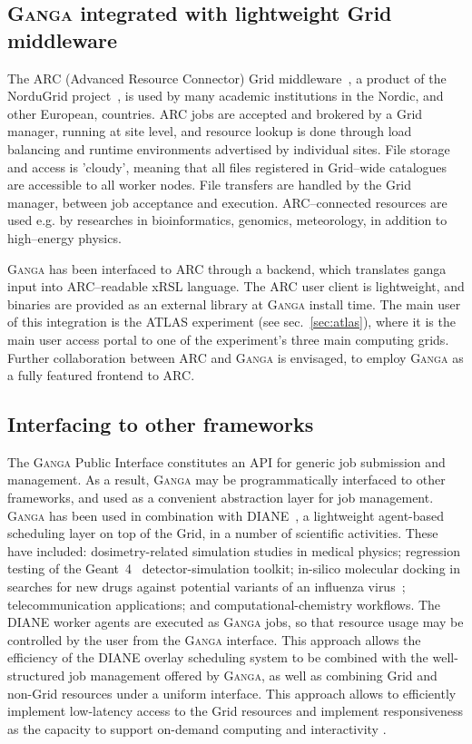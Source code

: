 \documentclass{elsart}
\def\ganga {\textsc{Ganga}\xspace}
\def\diane {\textsc{DIANE}\xspace}
\def\grid {Grid\xspace}
\begin{document}
\subsection{\ganga integrated with lightweight \grid middleware}

The ARC (Advanced Resource Connector) \grid middleware~\cite{ellert_2007}, a
product of the NorduGrid project~\cite{ellert_2003}, is used by many academic
institutions in the Nordic, and other European, countries. ARC jobs are accepted and
brokered by a \grid manager, running at site level, and resource lookup
is done through load balancing and runtime environments advertised by
individual sites. File storage and access is 'cloudy', meaning that
all files registered in \grid--wide catalogues are accessible to all
worker nodes. File transfers are handled by the \grid manager, between
job acceptance and execution. ARC--connected resources are used
e.g. by researches in bioinformatics, genomics, meteorology, in
addition to high--energy physics.

\ganga has been interfaced to ARC through a backend, which translates
ganga input into ARC--readable xRSL language. The ARC user client is
lightweight, and binaries are provided as an external library at \ganga
install time. The main user of this integration is the ATLAS
experiment (see sec.~\ref{sec:atlas}), where it is the main user
access portal to one of the experiment's three main computing
grids. Further collaboration between ARC and \ganga is envisaged, to
employ \ganga as a fully featured frontend to ARC.

\subsection{Interfacing to other frameworks}
\label{sec:GangaInOtherFrameworks}
The \ganga Public Interface constitutes an API for generic job submission
and management.  As a result, \ganga may be programmatically
interfaced to other frameworks, and used as a convenient abstraction layer for
job management. \ganga has been used in combination with \diane~\cite{DIANE},
a lightweight agent-based
scheduling layer on top of the \grid, in a number
of scientific activities.  These have included: dosimetry-related simulation
studies in medical physics; regression testing of the Geant~4~\cite{Geant4}
detector-simulation toolkit;
in-silico molecular docking in searches for 
new drugs against potential variants of an influenza virus~\cite{AvianFlu};
telecommunication applications; and computational-chemistry workflows. The
\diane worker agents are executed as \ganga jobs, so that resource usage
may be controlled by the user from the \ganga interface. This
approach allows the efficiency of the \diane overlay scheduling system
to be combined with the well-structured job management offered by \ganga, as well as
combining \grid and non-\grid resources under a uniform interface. This approach
allows to efficiently implement low-latency access to the \grid resources and implement
responsiveness as the capacity to support on-demand computing and interactivity 
\cite{SchedulingForResponsiveGrids}.
\end{document}
